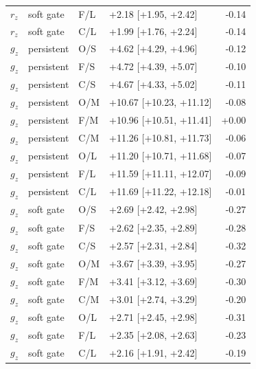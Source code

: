 \begin{longtable}{@{}lllp{4.4cm}r@{}}
$r_z$ & soft gate & F/L & +2.18 [+1.95, +2.42] & -0.14\\
$r_z$ & soft gate & C/L & +1.99 [+1.76, +2.24] & -0.14\\
\midrule
$g_z$ & persistent & O/S & +4.62 [+4.29, +4.96] & -0.12\\
$g_z$ & persistent & F/S & +4.72 [+4.39, +5.07] & -0.10\\
$g_z$ & persistent & C/S & +4.67 [+4.33, +5.02] & -0.11\\
$g_z$ & persistent & O/M & +10.67 [+10.23, +11.12] & -0.08\\
$g_z$ & persistent & F/M & +10.96 [+10.51, +11.41] & +0.00\\
$g_z$ & persistent & C/M & +11.26 [+10.81, +11.73] & -0.06\\
$g_z$ & persistent & O/L & +11.20 [+10.71, +11.68] & -0.07\\
$g_z$ & persistent & F/L & +11.59 [+11.11, +12.07] & -0.09\\
$g_z$ & persistent & C/L & +11.69 [+11.22, +12.18] & -0.01\\
\midrule
$g_z$ & soft gate & O/S & +2.69 [+2.42, +2.98] & -0.27\\
$g_z$ & soft gate & F/S & +2.62 [+2.35, +2.89] & -0.28\\
$g_z$ & soft gate & C/S & +2.57 [+2.31, +2.84] & -0.32\\
$g_z$ & soft gate & O/M & +3.67 [+3.39, +3.95] & -0.27\\
$g_z$ & soft gate & F/M & +3.41 [+3.12, +3.69] & -0.30\\
$g_z$ & soft gate & C/M & +3.01 [+2.74, +3.29] & -0.20\\
$g_z$ & soft gate & O/L & +2.71 [+2.45, +2.98] & -0.31\\
$g_z$ & soft gate & F/L & +2.35 [+2.08, +2.63] & -0.23\\
$g_z$ & soft gate & C/L & +2.16 [+1.91, +2.42] & -0.19\\
\end{longtable}\endgroup
